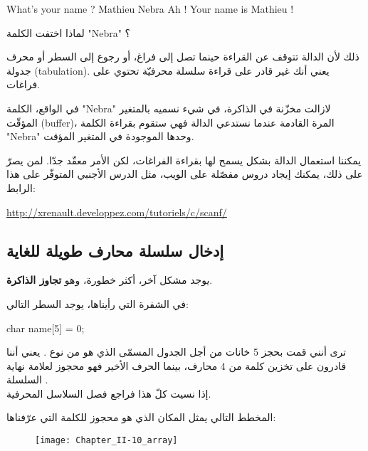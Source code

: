 \begin{Console}
What's your name ? Mathieu Nebra
Ah ! Your name is Mathieu !
\end{Console}

\begin{question}
لماذا اختفت الكلمة
"\textenglish{Nebra}"
؟
\end{question}

ذلك لأن الدالة
تتوقف عن القراءة حينما تصل إلى فراغ، أو رجوع إلى السطر أو محرف جدولة
(\textenglish{tabulation}).
يعني أنك غير قادر على قراءة سلسلة محرفيّة تحتوي على فراغات.

\begin{information}
  في الواقع، الكلمة
  "\textenglish{Nebra}"
  لازالت مخزّنة في الذاكرة، في  شيء نسميه بالمتغير المؤقّت
  (\textenglish{buffer})،
  المرة القادمة عندما نستدعي الدالة
  فهي ستقوم بقراءة الكلمة
  "\textenglish{Nebra}"
    وحدها الموجودة في المتغير المؤقت.
\end{information}

يمكننا استعمال الدالة
بشكل يسمح لها بقراءة الفراغات، لكن الأمر معقّد جدّا. لمن يصرّ على ذلك، يمكنك إيجاد دروس مفصّلة على الويب، مثل الدرس الأجنبي المتوفّر على هذا الرابط:

\url{http://xrenault.developpez.com/tutoriels/c/scanf/}

\subsection{إدخال سلسلة محارف طويلة للغاية}

يوجد مشكل آخر، أكثر خطورة، وهو
\textbf{تجاوز الذاكرة}.

في الشفرة التي رأيناها، يوجد السطر التالي:

\begin{Csource}
char name[5] = {0};
\end{Csource}

ترى أنني قمت بحجز 5 خانات من أجل الجدول المسمّى
الذي هو من نوع
.
يعني أننا قادرون على تخزين كلمة من 4 محارف، بينما الحرف الأخير فهو محجوز لعلامة نهاية السلسلة
.\\
إذا نسيت كلّ هذا فراجع فصل السلاسل المحرفية.

المخطط التالي يمثل المكان الذي هو محجوز للكلمة التي عرّفناها:

\begin{figure}[H]
	\centering
	\texttt{[image: Chapter\_II-10\_array]}
\end{figure}

